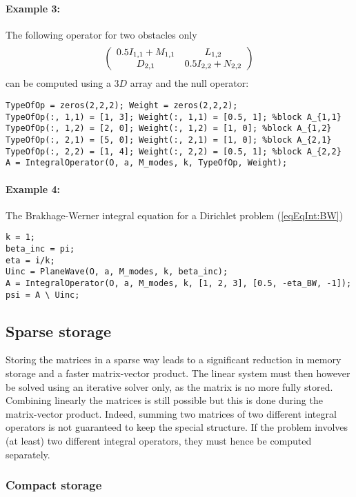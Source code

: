 \paragraph{Example 3:} The following operator for two obstacles only
$$
\left(\begin{array}{c c}
0.5 I_{1,1}+ M_{1,1} & L_{1,2}\\
D_{2,1} & 0.5 I_{2,2}+N_{2,2}
\end{array}\right)
$$
can be computed using a $3D$ array and the null operator:
\begin{verbatim}
TypeOfOp = zeros(2,2,2); Weight = zeros(2,2,2);
TypeOfOp(:, 1,1) = [1, 3]; Weight(:, 1,1) = [0.5, 1]; %block A_{1,1}
TypeOfOp(:, 1,2) = [2, 0]; Weight(:, 1,2) = [1, 0]; %block A_{1,2}
TypeOfOp(:, 2,1) = [5, 0]; Weight(:, 2,1) = [1, 0]; %block A_{2,1}
TypeOfOp(:, 2,2) = [1, 4]; Weight(:, 2,2) = [0.5, 1]; %block A_{2,2}
A = IntegralOperator(O, a, M_modes, k, TypeOfOp, Weight);
\end{verbatim}
\paragraph{Example 4:} The Brakhage-Werner integral equation for a Dirichlet problem (\ref{eqEqInt:BW})
\begin{verbatim}
k = 1;
beta_inc = pi;
eta = i/k;
Uinc = PlaneWave(O, a, M_modes, k, beta_inc);
A = IntegralOperator(O, a, M_modes, k, [1, 2, 3], [0.5, -eta_BW, -1]);
psi = A \ Uinc;
\end{verbatim}

\subsection{Sparse storage}

Storing the matrices in a sparse way leads to a significant reduction in memory storage and a faster matrix-vector product. The linear system must then however be solved using an iterative solver only, as the matrix is no more fully stored. Combining linearly the matrices is still possible but this is done during the matrix-vector product. Indeed, summing two matrices of two different integral operators is not guaranteed to keep the special structure. If the problem involves (at least) two different integral operators, they must hence be computed separately.

\subsubsection{Compact storage}

